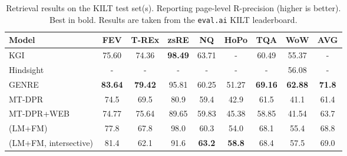 \begin{table*}[t]
\footnotesize
\setlength{\tabcolsep}{5pt}
\centering
\begin{tabular}{lSSSSSSS|S}
\toprule
\textbf{Model}        & {\textbf{FEV}}  & {\textbf{T-REx}} & {\textbf{zsRE}} & {\textbf{NQ}}   & {\textbf{HoPo}} & {\textbf{TQA}}  & {\textbf{WoW}}  & {\textbf{AVG}}  \\ \midrule
KGI \citep{glass-etal-2021-robust}               
& 75.60 & 74.36 & \bfseries 98.49 & 63.71 & {-}   & 60.49 & 55.37 & {-} \\
Hindsight \citep{paranjape-etal-2021-hindsight}         
& {-}   & {-}   & {-}   & {-}   & {-}   & {-}   & 56.08 & {-} \\
GENRE \citep{decao-etal-2021-autoregressive}             
& \bfseries 83.64 & \bfseries 79.42 & 95.81 & 60.25 & 51.27 & \bfseries 69.16 & \bfseries 62.88 & \bfseries 71.8 \\
MT-DPR \citep{maillard-etal-2021-multi}
& 74.5 & 69.5 & 80.9 & 59.4 & 42.9 & 61.5 & 41.1 & 61.4 \\
MT-DPR+WEB \citep{piktus-etal-2021-web}        
& 74.77 & 75.64 & 89.65 & 59.83 & 45.38 & 58.85 & 41.54 & 63.7  \\ \midrule
\system{} (LM+FM)
& 77.8 & 67.8 & 98.0 & 60.3 & 54.0 & 68.1 & 55.4 & 68.8 \\
\system{} (LM+FM, intersective)	
& 81.4 & 62.1 & 91.6 & \bfseries 63.2 & \bfseries 58.8 & 68.4 & 57.5 & 69.0 \\
\bottomrule
\end{tabular}
\caption{Retrieval results on the KILT test set(s). Reporting page-level R-precision (higher is better). Best in bold. Results are taken from the \texttt{eval.ai} KILT leaderboard.}
\label{tab:kilt-test-rp-page}
\end{table*}
